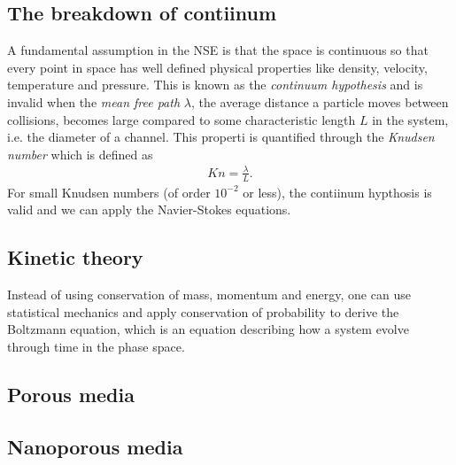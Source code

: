 \subsection{The breakdown of contiinum}
A fundamental assumption in the NSE is that the space is continuous so that every point in space has well defined physical properties like density, velocity, temperature and pressure. This is known as the \textit{continuum hypothesis} and is invalid when the \textit{mean free path} $\lambda$, the average distance a particle moves between collisions, becomes large compared to some characteristic length $L$ in the system, i.e. the diameter of a channel. This properti is quantified through the \textit{Knudsen number} which is defined as
\begin{align}
	Kn = \frac{\lambda}{L}.
\end{align}
For small Knudsen numbers (of order $10^{-2}$ or less), the contiinum hypthosis is valid and we can apply the Navier-Stokes equations.
\subsection{Kinetic theory}
Instead of using conservation of mass, momentum and energy, one can use statistical mechanics and apply conservation of probability to derive the Boltzmann equation, which is an equation describing how a system evolve through time in the phase space. 
\subsection{Porous media}

\subsection{Nanoporous media}